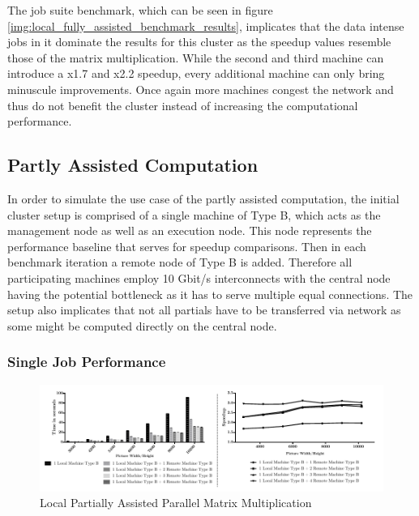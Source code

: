 The job suite benchmark, which can be seen in figure \ref{img:local_fully_assisted_benchmark_results}, implicates that the data intense jobs in it dominate the results for this cluster as the speedup values resemble those of the matrix multiplication. While the second and third machine can introduce a x1.7 and x2.2 speedup, every additional machine can only bring minuscule improvements. Once again more machines congest the network and thus do not benefit the cluster instead of increasing the computational performance.

\subsection{Partly Assisted Computation}

In order to simulate the use case of the partly assisted computation, the initial cluster setup is comprised of a single machine of Type B, which acts as the management node as well as an execution node. This node represents the performance baseline that serves for speedup comparisons. Then in each benchmark iteration a remote node of Type B is added. Therefore all participating machines employ 10 Gbit/s interconnects with the central node having the potential bottleneck as it has to serve multiple equal connections. The setup also implicates that not all partials have to be transferred via network as some might be computed directly on the central node.

\subsubsection*{Single Job Performance}
\label{single_job_performance}

\begin{figure}[!htb]

	\includegraphics[width=1.0\textwidth]{images/local_partially_assisted_matrix.pdf}
	\centering
	\caption{Local Partially Assisted Parallel Matrix Multiplication}
	\label{img:parallel_matrix}
\end{figure}

